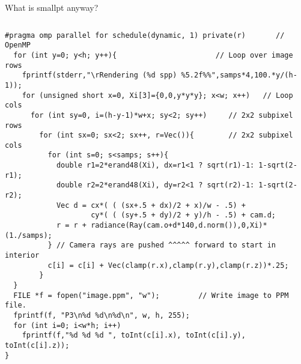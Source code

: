 \documentclass[8pt]{beamer}
\begin{document}
\begin{frame}[fragile]{What is smallpt anyway?}
\begin{adjustwidth}{-4em}{-4em}
\begin{columns}
\begin{column}{0.48 \textwidth}
{\begin{verbatim}
#pragma omp parallel for schedule(dynamic, 1) private(r)       // OpenMP 
  for (int y=0; y<h; y++){                       // Loop over image rows 
    fprintf(stderr,"\rRendering (%d spp) %5.2f%%",samps*4,100.*y/(h-1)); 
    for (unsigned short x=0, Xi[3]={0,0,y*y*y}; x<w; x++)   // Loop cols 
      for (int sy=0, i=(h-y-1)*w+x; sy<2; sy++)     // 2x2 subpixel rows 
        for (int sx=0; sx<2; sx++, r=Vec()){        // 2x2 subpixel cols 
          for (int s=0; s<samps; s++){ 
            double r1=2*erand48(Xi), dx=r1<1 ? sqrt(r1)-1: 1-sqrt(2-r1); 
            double r2=2*erand48(Xi), dy=r2<1 ? sqrt(r2)-1: 1-sqrt(2-r2); 
            Vec d = cx*( ( (sx+.5 + dx)/2 + x)/w - .5) + 
                    cy*( ( (sy+.5 + dy)/2 + y)/h - .5) + cam.d; 
            r = r + radiance(Ray(cam.o+d*140,d.norm()),0,Xi)*(1./samps); 
          } // Camera rays are pushed ^^^^^ forward to start in interior 
          c[i] = c[i] + Vec(clamp(r.x),clamp(r.y),clamp(r.z))*.25; 
        } 
  } 
  FILE *f = fopen("image.ppm", "w");         // Write image to PPM file. 
  fprintf(f, "P3\n%d %d\n%d\n", w, h, 255); 
  for (int i=0; i<w*h; i++) 
    fprintf(f,"%d %d %d ", toInt(c[i].x), toInt(c[i].y), toInt(c[i].z)); 
} 
\end{verbatim}
}
\end{column}
\end{columns}
\end{adjustwidth}
\end{frame}
\end{document}
